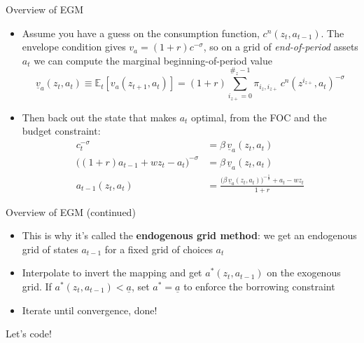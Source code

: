 \documentclass[
  10pt,
  ignorenonframetext,
  aspectratio=43,
  english,
  handout]{beamer}
\providecommand{\tightlist}{%
  \setlength{\itemsep}{0pt}\setlength{\parskip}{0pt}}
\begin{document}
\begin{frame}{Overview of EGM}
\protect{}\label{overview-of-egm}
\begin{itemize}
\tightlist
\item
  Assume you have a guess on the consumption function,
  \(c^{n}(z_{t},a_{t-1})\). The envelope condition gives
  \(v_{a}=(1+r)c^{-\sigma}\), so on a grid of \emph{end-of-period}
  assets \(a_{t}\) we can compute the marginal beginning-of-period value
  \[
  \underline{v}_{a}(z_{t},a_{t})\equiv \mathbb{E}_{t}\left[v_{a}(z_{t+1},a_{t})\right] = (1+r)\sum^{\#_{z}-1}_{i_{z+}=0}\pi_{i_{z},i_{z+}}\,c^{n}(z^{i_{z+}},a_{t})^{-\sigma}
  \]
\item
  Then back out the state that makes \(a_{t}\) optimal, from the FOC and
  the budget constraint: \[\begin{aligned}
    c_{t}^{-\sigma} &= \beta\,\underline{v}_{a}(z_{t},a_{t}) \\
    \big((1+r)a_{t-1}+wz_{t}-a_{t}\big)^{-\sigma} &= \beta\,\underline{v}_{a}(z_{t},a_{t}) \\
    a_{t-1}(z_{t},a_{t}) &= \frac{\big(\beta\,\underline{v}_{a}(z_{t},a_{t})\big)^{-\frac{1}{\sigma}}+a_{t}-w z_{t}}{1+r}
  \end{aligned}\]
\end{itemize}
\end{frame}

\begin{frame}{Overview of EGM (continued)}
\protect{}\label{overview-of-egm-continued}
\begin{itemize}
\tightlist
\item
  This is why it's called the \textbf{endogenous grid method}: we get an
  endogenous grid of states \(a_{t-1}\) for a fixed grid of choices
  \(a_t\)
\item
  Interpolate to invert the mapping and get \(a^{\ast}(z_t,a_{t-1})\) on
  the exogenous grid. If \(a^{\ast}(z_t,a_{t-1})< \underline{a}\), set
  \(a^{\ast}=\underline{a}\) to enforce the borrowing constraint
\item
  Iterate until convergence, done!
\end{itemize}
\end{frame}

\begin{frame}{}
\protect{}\label{section-4}
\begin{center}
\LARGE Let's code!
\end{center}
\end{frame}
\end{document}
